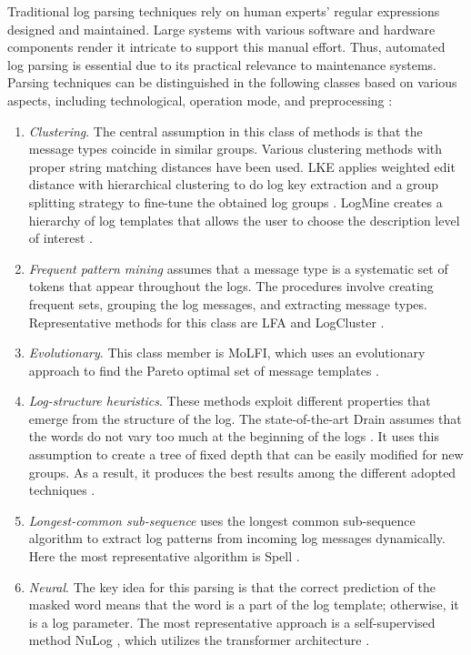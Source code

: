 Traditional log parsing techniques rely on human experts' regular expressions designed and maintained. Large systems with various software and hardware components render it intricate to support this manual effort. Thus, automated log parsing is essential due to its practical relevance to maintenance systems. Parsing techniques can be distinguished in the following classes based on various aspects, including technological, operation mode, and preprocessing \cite{nedelkoski2020self}: 
\begin{enumerate}
\item \textit{Clustering}. The central assumption in this class of methods is that the message types coincide in similar groups. Various clustering methods with proper string matching distances have been used. LKE applies weighted edit distance with hierarchical clustering to do log key extraction and a group splitting strategy to fine-tune the obtained log groups \cite{fu2009execution}. LogMine creates a hierarchy of log templates that allows the user to choose the description level of interest \cite{hamooni2016logmine}.
\item \textit{Frequent pattern mining} assumes that a message type is a systematic set of tokens that appear throughout the logs. The procedures involve creating frequent sets, grouping the log messages, and extracting message types. Representative methods for this class are LFA \cite{nandi2016anomaly} and LogCluster \cite{xu2009detecting}.
\item \textit{Evolutionary}. This class member is MoLFI, which uses an evolutionary approach to find the Pareto optimal set of message templates \cite{messaoudi2018search}.
\item \textit{Log-structure heuristics}. These methods exploit different properties that emerge from the structure of the log. The state-of-the-art Drain assumes that the words do not vary too much at the beginning of the logs \cite{he2017drain}. It uses this assumption to create a tree of fixed depth that can be easily modified for new groups. As a result, it produces the best results among the different adopted techniques \cite{zhu2019tools}.
\item \textit{Longest-common sub-sequence} uses the longest common sub-sequence algorithm to extract log patterns from incoming log messages dynamically. Here the most representative algorithm is Spell \cite{du2016spell}.
\item \textit{Neural}. The key idea for this parsing is that the correct prediction of the masked word means that the word is a part of the log template; otherwise, it is a log parameter. The most representative approach is a self-supervised method NuLog \cite{nedelkoski2020self}, which utilizes the transformer architecture \cite{devlin2018bert}.
\end{enumerate}